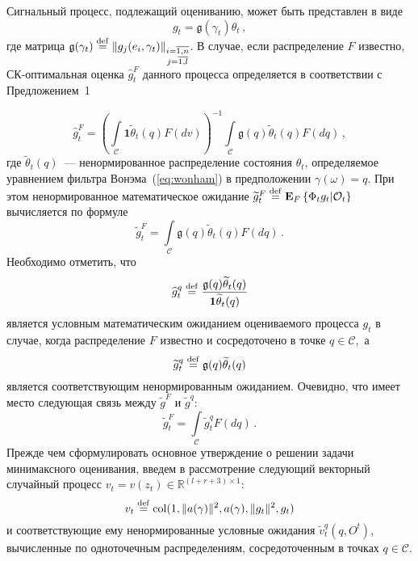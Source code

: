 \begin{multicols}{2}
 Сигнальный процесс, подлежащий оцениванию, может быть представлен в виде
 \begin{equation*}
 g_t=\mathfrak{g}(\gamma_t)\theta_t\,,
 \end{equation*}
 где матрица
$\mathfrak{g}(\gamma_t)\stackrel{\mathrm {def}}{=} \|g_j(e_i,\gamma_t)\|_{\substack{{i=\overline{1,n}}\\ {j=\overline{1,l}}}}$.
 В случае, если распределение $F$ известно, СК-оп\-ти\-маль\-ная оценка $\widehat{g}^F_t$
 данного процесса определяется %
в соответствии с Предложением~1

\noindent
 \begin{equation}
 \widehat{g}^F_t=
\left( \int\limits_{\mathcal{C}}\mathbf{1}\widetilde{\theta}_t(q)F(dv)
\right)^{-1}
\int\limits_{\mathcal{C}}\mathfrak{g}(q)\widetilde{\theta}_t(q)F(dq)\,,
 \label{eq:opt_est_2}
 \end{equation}
 где $\widetilde{\theta}_t(q)$~--- ненормированное распределение
 состояния $\theta_t$, определяемое уравнением фильтра
Вонэма~(\ref{eq:wonham}) в предположении $\gamma(\omega)=q$.
 При этом ненормированное математическое ожидание $\widetilde{g}^F_t \stackrel{\mathrm {def}}{=} \mathbf{E}_{ F }\left\{ \mathop{\Phi_t
 g_t|\mathcal{O}_t} \right\}$ вычисляется по формуле
 \begin{equation*}
 \widetilde{g}^F_t=
\int\limits_{\mathcal{C}}\mathfrak{g}(q)\widetilde{\theta}_t(q)F(dq)\,.
 \end{equation*}
 Необходимо отметить, что
 \begin{equation*}
 \widehat{g}^q_t \stackrel{\mathrm {def}}{=} \frac{\mathfrak{g}(q)\widetilde{\theta}_t(q)}
{\mathbf{1}\widetilde{\theta}_t(q)}
 \end{equation*}
 является условным математическим ожиданием оцениваемого процесса $g_t$ в
 случае, когда распределение $F$ известно и сосредоточено в точке $q \in
 \mathcal{C}$,~а
 \begin{equation*}
 \widetilde{g}^q_t \stackrel{\mathrm {def}}{=}
 \mathfrak{g}(q)\widetilde{\theta}_t(q)
 \end{equation*}
 является соответствующим ненормированным ожиданием. Очевидно, что имеет место сле\-ду\-ющая связь между
 $\widetilde{g}^F$ и $\widetilde{g}^q$:
 \begin{equation*}
 \widetilde{g}^F_t=
\int\limits_{\mathcal{C}}\widetilde{g}^q_tF(dq)\,.
 \end{equation*}
 Прежде чем сформулировать основное утверждение о решении задачи
 минимаксного оценивания, введем в рассмотрение следующий векторный случайный процесс
 $v_t=v(z_t) \in \mathbb{R}^{(l+r+3)\times 1}$:
 \begin{equation*}
 v_t\stackrel{\mathrm {def}}{=} \mathop{\mathrm{col}}
 (1,\|a(\gamma)\|^2,a(\gamma),\|g_t\|^2,g_t)
 \end{equation*}
 и соответствующие ему ненормированные условные ожидания
 $\widetilde{v}_t^q(q,O^t)$, вычисленные по одноточечным распределениям,
 сосредоточенным в точках $q \in \mathcal{C}$.


\end{multicols}

